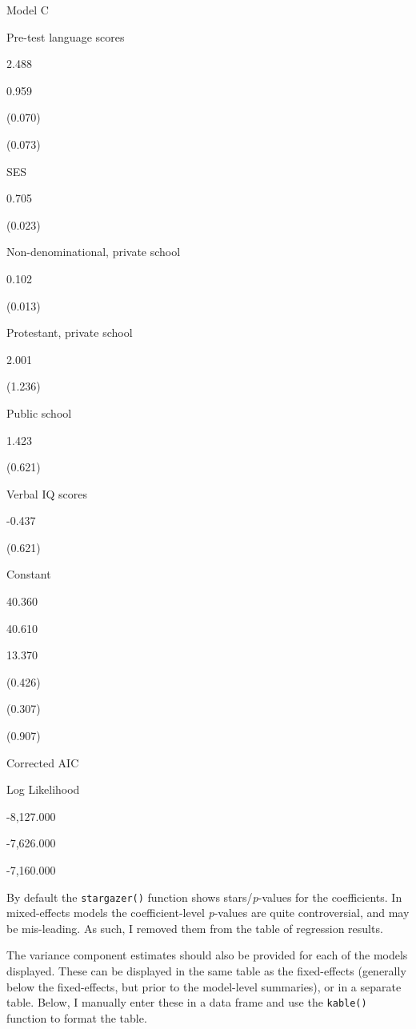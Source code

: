 \documentclass[]{book}
\begin{document}
Model C

Pre-test language scores

2.488

0.959

(0.070)

(0.073)

SES

0.705

(0.023)

Non-denominational, private school

0.102

(0.013)

Protestant, private school

2.001

(1.236)

Public school

1.423

(0.621)

Verbal IQ scores

-0.437

(0.621)

Constant

40.360

40.610

13.370

(0.426)

(0.307)

(0.907)

Corrected AIC

Log Likelihood

-8,127.000

-7,626.000

-7,160.000

By default the \texttt{stargazer()} function shows stars/\emph{p}-values for the coefficients. In mixed-effects models the coefficient-level \emph{p}-values are quite controversial, and may be mis-leading. As such, I removed them from the table of regression results.

The variance component estimates should also be provided for each of the models displayed. These can be displayed in the same table as the fixed-effects (generally below the fixed-effects, but prior to the model-level summaries), or in a separate table. Below, I manually enter these in a data frame and use the \texttt{kable()} function to format the table.
\end{document}
